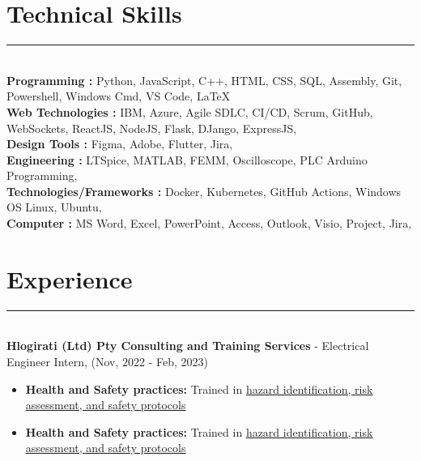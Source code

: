 \documentclass[12pt]{article}
\begin{document}
\vspace{-3mm}\section*{\fontsize{14}{1}\selectfont\color{color_29791}Technical Skills}\vspace{-9pt} 
\rule{\textwidth}{0.4pt}
\vspace{2pt}
\\{\fontsize{9}{1}\selectfont\color{color_29791}\hspace{5mm}\textbf{Programming :} Python, JavaScript, C++, HTML, CSS, SQL, Assembly, Git, Powershell, Windows Cmd, VS Code, LaTeX}
\\{\fontsize{9}{1}\selectfont\color{color_29791}\hspace{5mm}\textbf{Web Technologies :} IBM, Azure, Agile SDLC, CI/CD, Scrum, GitHub, WebSockets, ReactJS, NodeJS, Flask, DJango, ExpressJS,}
\\{\fontsize{9}{1}\selectfont\color{color_29791}\hspace{5mm}\textbf{Design Tools :} Figma, Adobe, Flutter, Jira,}
\\{\fontsize{9}{1}\selectfont\color{color_29791}\hspace{5mm}\textbf{Engineering :} LTSpice, MATLAB, FEMM, Oscilloscope, PLC Arduino Programming,}
\\{\fontsize{9}{1}\selectfont\color{color_29791}\hspace{5mm}\textbf{Technologies/Frameworks :} Docker, Kubernetes, GitHub Actions, Windows OS Linux, Ubuntu,}
\\{\fontsize{9}{1}\selectfont\color{color_29791}\hspace{5mm}\textbf{Computer :} MS Word, Excel, PowerPoint, Access, Outlook, Visio, Project, Jira,}

\vspace{-3mm}\section*{\fontsize{14}{1}\selectfont\color{color_29791}Experience}\vspace{-9pt} 
\rule{\textwidth}{0.4pt}
\vspace{2pt}
\\\textbf{Hlogirati (Ltd) Pty Consulting and Training Services} - Electrical Engineer Intern, (Nov, 2022 - Feb, 2023)
\vspace{-3mm}
\begin{itemize}
  \item \textbf{Health and Safety practices:} Trained in \href{https://drive.google.com/file/d/1i5SDy8WoBzwGOmAEAcxJzVyCb1c7Gfqq/view?usp=sharing}{\underline{hazard identification, risk assessment, and safety protocols}}
  \vspace{-3mm}\item \textbf{Health and Safety practices:} Trained in \href{https://drive.google.com/file/d/1i5SDy8WoBzwGOmAEAcxJzVyCb1c7Gfqq/view?usp=sharing}{\underline{hazard identification, risk assessment, and safety protocols}}
\end{itemize}
\end{document}
